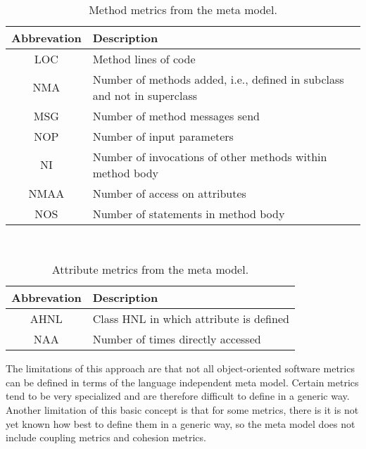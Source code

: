 \begin{table}
	\caption{Method metrics from the meta model.}~\label{tab:methodmetrics}
	
	\setlength\tabcolsep{3pt}
	\renewcommand{\arraystretch}{1.4}%
	\begin{tabularx}{\columnwidth}{ | c | p{7cm} | }
		\hline
		Abbrevation & Description \\ \hline\hline
		LOC & Method lines of code \\ \hline
		NMA & Number of methods added, i.e., defined in subclass and not in superclass \\ \hline
		MSG & Number of method messages send \\ \hline
		NOP & Number of input parameters \\ \hline
		NI & Number of invocations of other methods within method body \\ \hline
		NMAA & Number of access on attributes \\ \hline
		NOS & Number of statements in method body \\ \hline
	\end{tabularx}
\end{table}

\begin{table}
	\caption{Attribute metrics from the meta model.}~\label{tab:attributesmetrics}
	
	\setlength\tabcolsep{3pt}
	\renewcommand{\arraystretch}{1.4}%
	\begin{tabularx}{\columnwidth}{ | c | p{7cm} | }
		\hline
		Abbrevation & Description \\ \hline\hline
		AHNL & Class HNL in which attribute is defined \\ \hline
		NAA & Number of times directly accessed \\ \hline
	\end{tabularx}
\end{table}

The limitations of this approach are that not all object-oriented software metrics can be defined in terms of the language independent meta model. Certain metrics tend to be very specialized and are therefore difficult to define in a generic way. Another limitation of this basic concept is that for some metrics, there is it is not yet known how best to define them in a generic way, so the meta model does not include coupling metrics and cohesion metrics.

